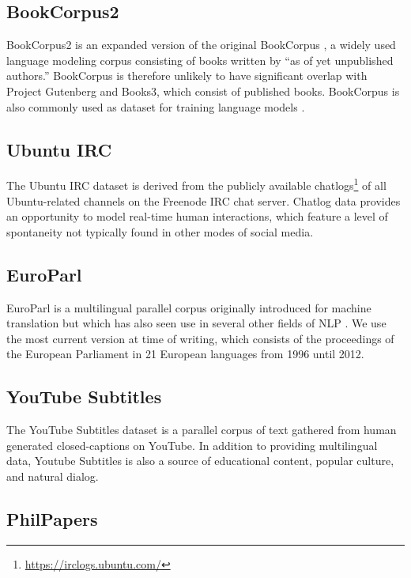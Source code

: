 \documentclass[11pt,a4paper]{article}
\begin{document}
\subsection{BookCorpus2}

BookCorpus2 is an expanded version of the original BookCorpus \citep{BookCorpus}, a widely used language modeling corpus consisting of books written by ``as of yet unpublished authors.'' BookCorpus is therefore unlikely to have significant overlap with Project Gutenberg and Books3, which consist of published books. BookCorpus is also commonly used as dataset for training language models \citep{GPT, BERT, RoBERTa}.

\subsection{Ubuntu IRC}

The Ubuntu IRC dataset is derived from the publicly available chatlogs\footnote{\url{https://irclogs.ubuntu.com/}} of all Ubuntu-related channels on the Freenode IRC chat server. Chatlog data provides an opportunity to model real-time human interactions, which feature a level of spontaneity not typically found in other modes of social media. 

\subsection{EuroParl}

EuroParl \citep{EuroParl} is a multilingual parallel corpus originally introduced for machine translation but which has also seen use in several other fields of NLP \citep{EuroParl-example1,EuroParl-example2,EuroParl-example3}. We use the most current version at time of writing, which consists of the proceedings of the European Parliament in 21 European languages from 1996 until 2012.

\subsection{YouTube Subtitles}


The YouTube Subtitles dataset is a parallel corpus of text gathered from human generated closed-captions on YouTube. In addition to providing multilingual data, Youtube Subtitles is also a source of educational content, popular culture, and natural dialog.

\subsection{PhilPapers}
\end{document}
